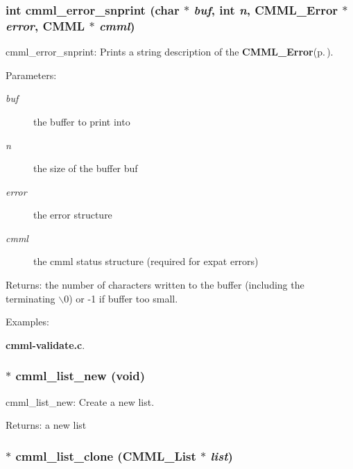 \subsubsection{\setlength{\rightskip}{0pt plus 5cm}int cmml\_\-error\_\-snprint (char $\ast$ {\em buf}, int {\em n}, {\bf CMML\_\-Error} $\ast$ {\em error}, {\bf CMML} $\ast$ {\em cmml})}\label{cmml_8h_a81}


cmml\_\-error\_\-snprint: Prints a string description of the {\bf CMML\_\-Error}{\rm (p.\,\pageref{structCMML__Error})}.

\begin{Desc}
\item[Parameters:]
\begin{description}
\item[{\em buf}]the buffer to print into \item[{\em n}]the size of the buffer buf \item[{\em error}]the error structure \item[{\em cmml}]the cmml status structure (required for expat errors)\end{description}
\end{Desc}
\begin{Desc}
\item[Returns:]the number of characters written to the buffer (including the terminating $\backslash$0) or -1 if buffer too small. \end{Desc}
\begin{Desc}
\item[Examples: ]\par
{\bf cmml-validate.c}.\end{Desc}
\subsubsection{$\ast$ cmml\_\-list\_\-new (void)}\label{cmml_8h_a82}


cmml\_\-list\_\-new: Create a new list.

\begin{Desc}
\item[Returns:]a new list \end{Desc}
\subsubsection{$\ast$ cmml\_\-list\_\-clone ({\bf CMML\_\-List} $\ast$ {\em list})}\label{cmml_8h_a83}


